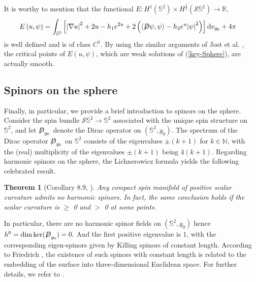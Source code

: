 \documentclass[a4paper, 12pt]{article}
\newtheorem{theorem}{Theorem}[section]
\def\slashiii#1{\setbox0=\hbox{$#1$}#1\hskip-\wd0\hbox to\wd0{\hss\sl/\/\hss}}
\begin{document}
It is worthy to mention that the functional \(E: {H^1}({\mathbb{S}^2}) \times {H^{\frac{1}{2}}}(\mathcal{S} {\mathbb{S}^2})\to \mathbb{R} \),
\begin{equation*}
	E\left( {u,\psi } \right) = \int_{{\mathbb{S}^2}} {\left[ {{{\left| {\nabla u} \right|}^2} + 2u - h_1{e^{2u}} + 2\left( {\left\langle {\slashiii{D}\psi ,\psi } \right\rangle  - h_2{e^{u}}{{\left| \psi  \right|}^2}} \right)} \right]{\text{d}{v}_{g_0}}}  + 4\pi
\end{equation*}
is well defined and is of class $C^1$. By using the similar arguments of Jost et al. \cite{jost2007super}, the critical points of $E(u,\psi)$, which are weak solutions of (\ref{key-Sphere}), are actually smooth.
\subsection{Spinors on the sphere}
Finally, in particular, we provide a brief introduction to spinors on the sphere. Consider the spin bundle \( \mathcal{S}\mathbb{S}^2 \to \mathbb{S}^2 \) associated with the unique spin structure on \( \mathbb{S}^2 \), and let \( \slashiii{D}_{g_0} \) denote the Dirac operator on \( (\mathbb{S}^2,g_0) \). The spectrum of the Dirac operator \( \slashiii{D}_{g_0} \) on \( \mathbb{S}^2 \) consists of the eigenvalues \( \pm(k + 1) \) for \( k \in \mathbb{N} \), with the (real) multiplicity of the eigenvalues \( \pm(k + 1) \) being \( 4(k + 1) \). Regarding harmonic spinors on the sphere, the Lichnerowicz formula yields the following celebrated result.
\begin{theorem}[Corollary 8.9, \cite{MR1031992}]\label{Lich}
	Any compact spin manifold of positive scalar curvature admits no harmonic spinors. In fact, the same conclusion holds if the scalar curvature is $\geq$ 0 and $>$ 0 at some points.
\end{theorem}
In particular, there are no harmonic spinor fields on \( \left( \mathbb{S}^2,g_0 \right) \) hence
${h^0} = \dim {\text{ker}}(\slashiii{D}_{g_0}) = 0.$	And the first positive eigenvalue is \( 1 \), with the corresponding eigen-spinors given by Killing spinors of constant length. According to Friedrich \cite{MR1653146}, the existence of such spinors with constant length is related to the embedding of the surface into three-dimensional Euclidean space. For further details, we refer to \cite{ammann2003variational,MR1777332,MR2509837,MR1031992}.
\end{document}
